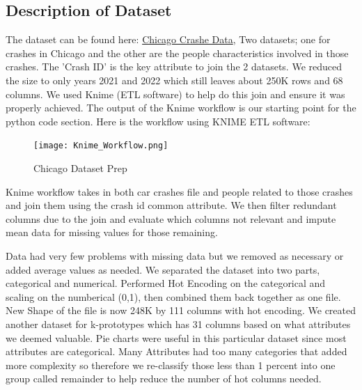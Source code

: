 \documentclass[conference]{IEEEtran}
\begin{document}
\subsection{Description of Dataset}
The dataset can be found here: \href{https://data.cityofchicago.org/Transportation/Traffic-Crashes-Crashes/85ca-t3if}{Chicago Crashe Data}, Two datasets; one for crashes in Chicago and the other are the people characteristics involved in those crashes.  The 'Crash ID' is the key attribute to join the 2 datasets.  We reduced the size to only years 2021 and 2022 which still leaves about 250K rows and 68 columns.  We used Knime (ETL software) to help do this join and ensure it was properly achieved. The output of the Knime workflow is our starting point for the python code section.
Here is the workflow using KNIME ETL software:
\begin{figure}[!h]
	\texttt{[image: Knime\_Workflow.png]}
	\caption{Chicago Dataset Prep}
	\label{fig: KNIME ETL for Chicago Dataset for Crashes and People involved}
 \end{figure}

 Knime workflow takes in both car crashes file and people related to those crashes and join them using the crash id common attribute.  We then filter redundant columns due to the join and evaluate which columns not relevant and impute mean data for missing values for those remaining.

Data had very few problems with missing data but we removed as necessary or added average values as needed. We separated the dataset into two parts, categorical and numerical.  Performed Hot Encoding on the categorical and scaling on the numberical (0,1), then combined them back together as one file.  New Shape of the file is now  248K by 111 columns with hot encoding. We created another dataset for k-prototypes which has 31 columns based on what attributes we deemed valuable.  Pie charts were useful in this particular dataset since most attributes are categorical.  Many Attributes had too many categories that added more complexity so therefore we re-classify those less than 1 percent into one group called remainder to help reduce the number of hot columns needed. \linebreak
\end{document}
